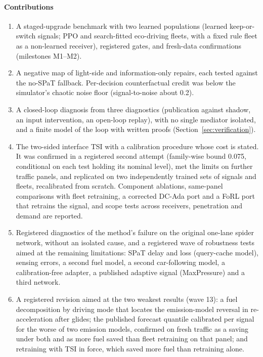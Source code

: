 \paragraph{Contributions}
\begin{enumerate}\setlength\itemsep{1pt}
\item A staged-upgrade benchmark with two learned populations (learned keep-or-switch signals; PPO and search-fitted eco-driving fleets,
with a fixed rule fleet as a non-learned receiver), registered gates, and fresh-data confirmations (milestones M1--M2).
\item A negative map of light-side and information-only repairs, each tested against the no-SPaT fallback. Per-decision counterfactual
credit was below the simulator's chaotic noise floor (signal-to-noise about 0.2).
\item A closed-loop diagnosis from three diagnostics (publication against shadow, an input intervention, an open-loop replay), with no
single mediator isolated, and a finite model of the loop with written proofs (Section~\ref{sec:verification}).
\item The two-sided interface TSI with a calibration procedure whose cost is stated. It was confirmed in a registered second attempt
(family-wise bound 0.075, conditional on each test holding its nominal level), met the limits on further traffic panels, and replicated
on two independently trained sets of signals and fleets, recalibrated from scratch. Component ablations, same-panel comparisons with fleet retraining, a corrected DC-Ada port and a FoRL port that retrains the signal, and scope
tests across receivers, penetration and demand are reported.
\item Registered diagnostics of the method's failure on the original one-lane spider network, without an isolated cause, and a registered wave of robustness tests aimed at the
remaining limitations: SPaT delay and loss (query-cache model), sensing errors, a second fuel model, a second car-following model, a calibration-free
adapter, a published adaptive signal (MaxPressure) and a third network.
\item A registered revision aimed at the two weakest results (wave 13): a fuel decomposition by driving mode that locates the
emission-model reversal in re-acceleration after glides; the published forecast quantile calibrated per signal for the worse of two
emission models, confirmed on fresh traffic as a saving under both and as more fuel saved than fleet retraining on that panel; and
retraining with TSI in force, which saved more fuel than retraining alone.

\end{enumerate}

